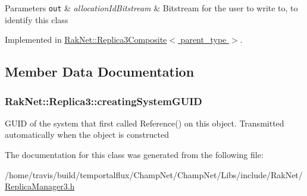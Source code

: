 \begin{DoxyParams}[1]{Parameters}
\mbox{\tt out}  & {\em allocation\-Id\-Bitstream} & Bitstream for the user to write to, to identify this class \\
\hline
\end{DoxyParams}


Implemented in \hyperlink{class_rak_net_1_1_replica3_composite_a7a05709ac67f8261dd5e3293c4374d3a}{Rak\-Net\-::\-Replica3\-Composite$<$ parent\-\_\-type $>$}.



\subsection{Member Data Documentation}
\hypertarget{class_rak_net_1_1_replica3_a02e865cdf4292bd4dd8c9795ebb3bb05}{
\subsubsection[{creating\-System\-G\-U\-I\-D}]{ Rak\-Net\-::\-Replica3\-::creating\-System\-G\-U\-I\-D}}\label{class_rak_net_1_1_replica3_a02e865cdf4292bd4dd8c9795ebb3bb05}
G\-U\-I\-D of the system that first called Reference() on this object. Transmitted automatically when the object is constructed 

The documentation for this class was generated from the following file\-:\begin{DoxyCompactItemize}
\item 
/home/travis/build/temportalflux/\-Champ\-Net/\-Champ\-Net/\-Libs/include/\-Rak\-Net/\hyperlink{_replica_manager3_8h}{Replica\-Manager3.\-h}\end{DoxyCompactItemize}
